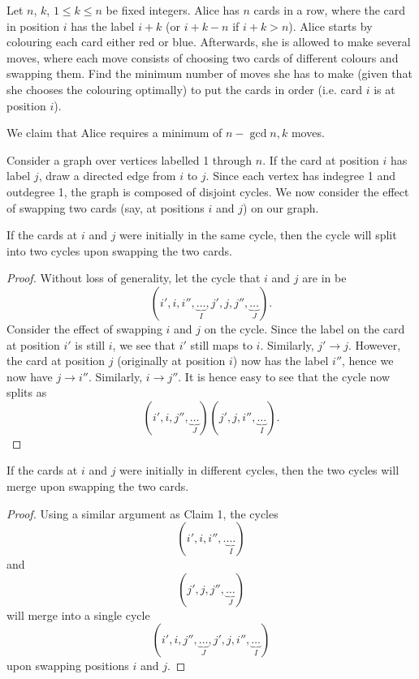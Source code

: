 \begin{question}[$n-\gcd{n, k}$]\label{Q::2022-O-2-4}
    Let $n$, $k$, $1 \leq k \leq n$ be fixed integers. Alice has $n$ cards in a row, where the card in position $i$ has the label $i + k$ (or $i + k - n$ if $i + k > n$). Alice starts by colouring each card either red or blue. Afterwards, she is allowed to make several moves, where each move consists of choosing two cards of different colours and swapping them. Find the minimum number of moves she has to make (given that she chooses the colouring optimally) to put the cards in order (i.e. card $i$ is at position $i$).
\end{question}
\begin{solution*}
    We claim that Alice requires a minimum of $n - \gcd{n, k}$ moves.

    Consider a graph over vertices labelled 1 through $n$. If the card at position $i$ has label $j$, draw a directed edge from $i$ to $j$. Since each vertex has indegree 1 and outdegree 1, the graph is composed of disjoint cycles. We now consider the effect of swapping two cards (say, at positions $i$ and $j$) on our graph.

    \begin{claim}
        If the cards at $i$ and $j$ were initially in the same cycle, then the cycle will split into two cycles upon swapping the two cards.
    \end{claim}
    \begin{proof}
        Without loss of generality, let the cycle that $i$ and $j$ are in be \[(i', i, i'', \underbrace{\ldots}_{I}, j', j, j'', \underbrace{\ldots}_{J}).\] Consider the effect of swapping $i$ and $j$ on the cycle. Since the label on the card at position $i'$ is still $i$, we see that $i'$ still maps to $i$. Similarly, $j' \to j$. However, the card at position $j$ (originally at position $i$) now has the label $i''$, hence we now have $j \to i''$. Similarly, $i \to j''$. It is hence easy to see that the cycle now splits as \[(i', i, j'', \underbrace{\ldots}_{J})(j', j, i'', \underbrace{\ldots}_{I}).\]
    \end{proof}

    \begin{claim}
        If the cards at $i$ and $j$ were initially in different cycles, then the two cycles will merge upon swapping the two cards.
    \end{claim}
    \begin{proof}
        Using a similar argument as Claim 1, the cycles \[(i', i, i'',. \underbrace{\ldots}_{I})\] and \[(j', j, j'', \underbrace{\ldots}_{J})\] will merge into a single cycle \[(i', i, j'', \underbrace{\ldots}_{J}, j', j, i'', \underbrace{\ldots}_{I})\] upon swapping positions $i$ and $j$.
    \end{proof}


\end{solution*}

